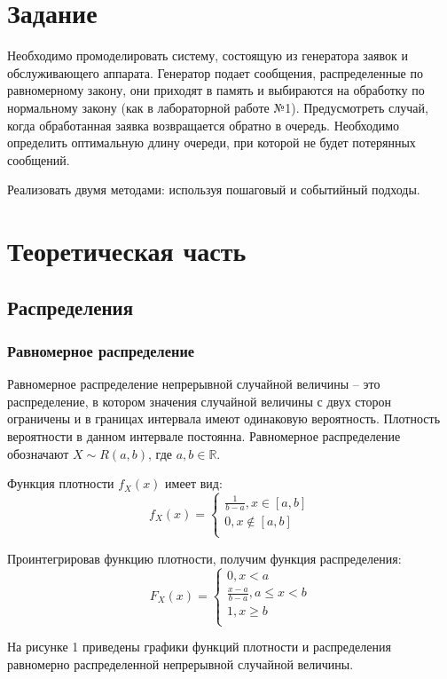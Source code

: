 
\section*{Задание}
Необходимо промоделировать систему, состоящую из генератора заявок и обслуживающего аппарата. Генератор подает сообщения, распределенные по равномерному закону, они приходят в память и выбираются на обработку по нормальному закону (как в лабораторной работе №1). Предусмотреть случай, когда обработанная заявка возвращается обратно в очередь. Необходимо определить оптимальную длину очереди, при которой не будет потерянных сообщений.

Реализовать двумя методами: используя пошаговый и событийный подходы.



\section*{Теоретическая часть}
\subsection*{Распределения}
\subsubsection*{Равномерное распределение}
Равномерное распределение непрерывной случайной величины – это распределение, в котором значения случайной величины с двух сторон ограничены и в границах интервала имеют одинаковую вероятность.
Плотность вероятности в данном интервале постоянна. Равномерное
распределение обозначают $X \sim R(a, b)$, где $a, b \in \mathbb{R}$.

Функция плотности $f_{X} (x)$ имеет вид:
$$
f_{X} (x) = 
\left\{\begin{matrix}
	\frac{1}{b - a}, x \in [a, b]\\ 
	0, x \notin [a, b] \\
\end{matrix}\right.
$$

Проинтегрировав функцию плотности, получим функция распределения:
$$
F_{X} (x) = 
\left\{\begin{matrix}
	0, x < a \\
	\frac{x - a}{b - a}, a \le x < b\\ 
	1, x \ge b \\
\end{matrix}\right.
$$

На рисунке 1 приведены графики функций плотности и распределения равномерно распределенной непрерывной случайной величины.

